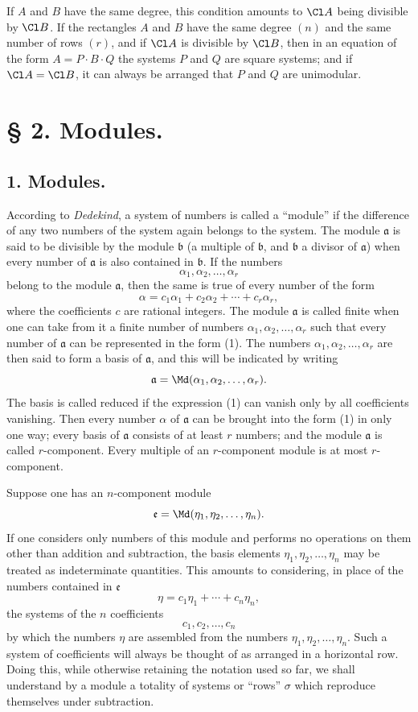 If $A$ and $B$ have the same degree, this condition amounts to $\Cl A$ being divisible by $\Cl B$. If the rectangles $A$ and $B$ have the same degree $(n)$ and the same number of rows $(r)$, and if $\Cl A$ is divisible by $\Cl B$, then in an equation of the form $A=P\cdot B\cdot Q$ the systems $P$ and $Q$ are square systems; and if $\Cl A=\Cl B$, it can always be arranged that $P$ and $Q$ are unimodular.

\section*{§ 2. Modules.}

\subsection*{1. Modules.}

According to \emph{Dedekind}, a system of numbers is called a ``module'' if the difference of any two numbers of the system again belongs to the system. The module $\mathfrak a$ is said to be divisible by the module $\mathfrak b$ (a multiple of $\mathfrak b$, and $\mathfrak b$ a divisor of $\mathfrak a$) when every number of $\mathfrak a$ is also contained in $\mathfrak b$. If the numbers
\[
 \alpha_1,\alpha_2,\ldots,\alpha_r
\]
belong to the module $\mathfrak a$, then the same is true of every number of the form
\begin{equation}
 \alpha=c_1\alpha_1+c_2\alpha_2+\cdots+c_r\alpha_r,
\tag{1}
\end{equation}
where the coefficients $c$ are rational integers. The module $\mathfrak a$ is called finite when one can take from it a finite number of numbers $\alpha_1,\alpha_2,\ldots,\alpha_r$ such that every number of $\mathfrak a$ can be represented in the form (1). The numbers $\alpha_1,\alpha_2,\ldots,\alpha_r$ are then said to form a basis of $\mathfrak a$, and this will be indicated by writing
\[
 \mathfrak a=\Md(\alpha_1,\alpha_2,\ldots,\alpha_r).
\]
The basis is called reduced if the expression (1) can vanish only by all coefficients vanishing. Then every number $\alpha$ of $\mathfrak a$ can be brought into the form (1) in only one way; every basis of $\mathfrak a$ consists of at least $r$ numbers; and the module $\mathfrak a$ is called $r$-component. Every multiple of an $r$-component module is at most $r$-component.

Suppose one has an $n$-component module
\[
 \mathfrak e=\Md(\eta_1,\eta_2,\ldots,\eta_n).
\]
If one considers only numbers of this module and performs no operations on them other than addition and subtraction, the basis elements $\eta_1,\eta_2,\ldots,\eta_n$ may be treated as indeterminate quantities. This amounts to considering, in place of the numbers contained in $\mathfrak e$
\[
 \eta=c_1\eta_1+\cdots+c_n\eta_n,
\]
the systems of the $n$ coefficients
\[
 c_1,c_2,\ldots,c_n
\]
by which the numbers $\eta$ are assembled from the numbers $\eta_1,\eta_2,\ldots,\eta_n$. Such a system of coefficients will always be thought of as arranged in a horizontal row. Doing this, while otherwise retaining the notation used so far, we shall understand by a module a totality of systems or ``rows'' $\sigma$ which reproduce themselves under subtraction.

